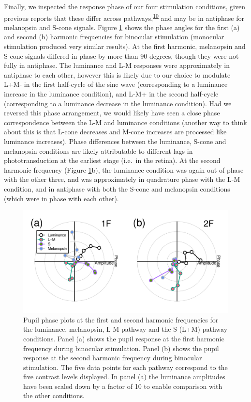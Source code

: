 \documentclass[
]{article}
\begin{document}
Finally, we inspected the response phase of our four stimulation conditions, given previous reports that these differ across pathways,\textsuperscript{\protect\hyperlink{ref-Spitschan2014}{10}} and may be in antiphase for melanopsin and S-cone signals. Figure \ref{fig:phaseplots} shows the phase angles for the first (a) and second (b) harmonic frequencies for binocular stimulation (monocular stimulation produced very similar results). At the first harmonic, melanopsin and S-cone signals differed in phase by more than 90 degrees, though they were not fully in antiphase. The luminance and L-M responses were approximately in antiphase to each other, however this is likely due to our choice to modulate L+M- in the first half-cycle of the sine wave (corresponding to a luminance increase in the luminance condition), and L-M+ in the second half-cycle (corresponding to a luminance decrease in the luminance condition). Had we reversed this phase arrangement, we would likely have seen a close phase correspondence between the L-M and luminance conditions (another way to think about this is that L-cone decreases and M-cone increases are processed like luminance increases). Phase differences between the luminance, S-cone and melanopsin conditions are likely attributable to different lags in phototransduction at the earliest stage (i.e.~in the retina). At the second harmonic frequency (Figure \ref{fig:phaseplots}b), the luminance condition was again out of phase with the other three, and was approximately in quadrature phase with the L-M condition, and in antiphase with both the S-cone and melanopsin conditions (which were in phase with each other).

\begin{figure}

{\centering \includegraphics{Figures/phaseplots} 

}

\caption{Pupil phase plots at the first and second harmonic frequencies for the luminance, melanopsin, L-M pathway and the S-(L+M) pathway conditions. Panel (a) shows the pupil response at the first harmonic frequency during binocular stimulation. Panel (b) shows the pupil response at the second harmonic frequency during binocular stimulation. The five data points for each pathway correspond to the five contrast levels displayed. In panel (a) the luminance amplitudes have been scaled down by a factor of 10 to enable comparison with the other conditions.}\label{fig:phaseplots}
\end{figure}
\end{document}
